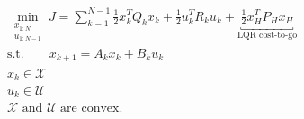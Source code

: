 
\begin{equation}
    \begin{aligned}
        \min_{\substack{x_{1:N}\\u_{1:N-1}}}J=\sum_{k=1}^{N-1}{\frac{1}{2}x_{k}^{T}Q_kx_k+\frac{1}{2}u_{k}^{T}R_ku_k}+\underset{\text{LQR cost-to-go}}{\underbracket{\frac{1}{2}x_{H}^{T}P_Hx_H}} \\
        \text{s.t.} \qquad x_{k+1} = A_k x_k + B_k u_k \\
        x_k\in \mathcal{X} \\
        u_k\in \mathcal{U} \\
        \mathcal{X} \text{ and } \mathcal{U} \text{ are convex.}
    \end{aligned}
\end{equation}

